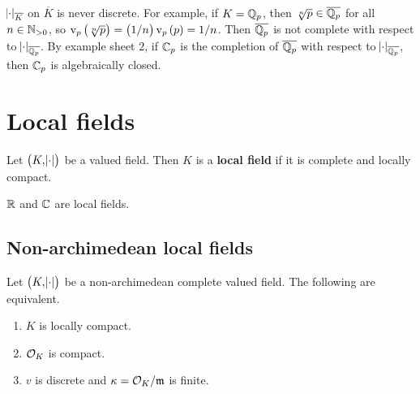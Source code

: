 \begin{remark*}
$ \abs{\cdot}_{\overline{K}} $ on $ \overline{K} $ is never discrete. For example, if $ K = \mathbb{Q}_p $, then $ \sqrt[n]{p} \in \overline{\mathbb{Q}_p} $ for all $ n \in \mathbb{N}_{> 0} $, so $ \v_p\br{\sqrt[n]{p}} = \br{1 / n}\v_p\br{p} = 1 / n $. Then $ \overline{\mathbb{Q}_p} $ is not complete with respect to $ \abs{\cdot}_{\overline{\mathbb{Q}_p}} $. By example sheet $ 2 $, if $ \mathbb{C}_p $ is the completion of $ \overline{\mathbb{Q}_p} $ with respect to $ \abs{\cdot}_{\overline{\mathbb{Q}_p}} $, then $ \mathbb{C}_p $ is algebraically closed.
\end{remark*}

\pagebreak

\section{Local fields}

\begin{definition}
Let $ \br{K, \abs{\cdot}} $ be a valued field. Then $ K $ is a \textbf{local field} if it is complete and locally compact.
\end{definition}

\begin{example*}
$ \mathbb{R} $ and $ \mathbb{C} $ are local fields.
\end{example*}

\subsection{Non-archimedean local fields}

\begin{proposition}
Let $ \br{K, \abs{\cdot}} $ be a non-archimedean complete valued field. The following are equivalent.
\begin{enumerate}
\item $ K $ is locally compact.
\item $ \mathcal{O}_K $ is compact.
\item $ v $ is discrete and $ \kappa = \mathcal{O}_K / \mathfrak{m} $ is finite.
\end{enumerate}
\end{proposition}

